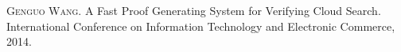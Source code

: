 
\begin{publications}{99}

    \item\textsc{Genguo Wang}. {A Fast Proof Generating System for Verifying Cloud Search}.
      International Conference on Information Technology and Electronic Commerce, 2014.

\end{publications}

